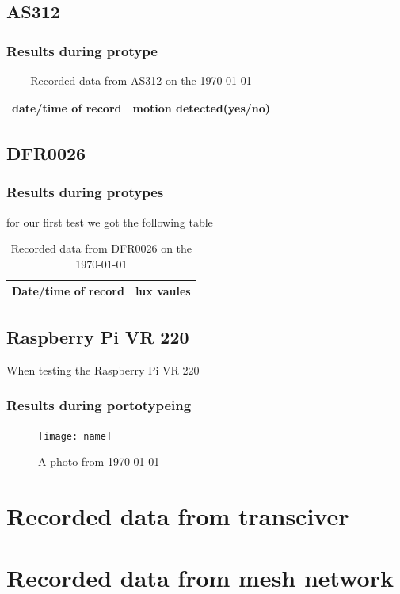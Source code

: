 \subsection{AS312}
\subsubsection{Results during protype}
\begin{table}[h!]
    \centering
    \begin{tabular}{|c|c|}
        \hline
        date/time of record & motion detected(yes/no)\\
        \hline \hline
    \end{tabular}
    \caption{Recorded data from  AS312 on the \today}
    \label{Recorded data from  AS312 on the \today}
\end{table}
\subsection{DFR0026}
\subsubsection{Results during protypes}
for our first test we got  the following  table 
\begin{table}[h!]
    \centering
    \begin{tabular}{|c|c|}
        \hline
        Date/time of record & lux vaules\\
        \hline \hline
    \end{tabular}
    \caption{Recorded data from DFR0026 on the \today}
    \label{Recorded data from DFR0026 on the \today}
\end{table}
\subsection{Raspberry Pi VR 220}
When testing  the Raspberry Pi VR 220
\subsubsection{Results during portotypeing}
\begin{figure}[h!]
    \centering
    \texttt{[image: name]}
    \caption{A photo from \today }
    \label{A photo from \today}
\end{figure}

\section{Recorded data from transciver}
\section{Recorded data from mesh network}